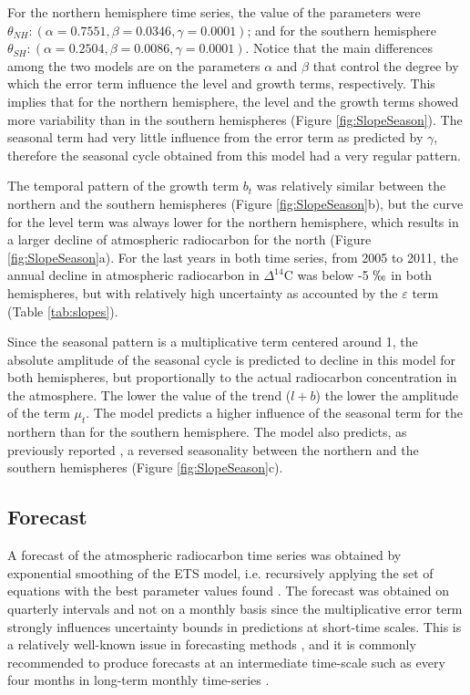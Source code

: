 \documentclass[a4paper, 11pt]{article}
\begin{document}
For the northern hemisphere time series, the value of the parameters were $\theta_{NH}: (\alpha = 0.7551, \beta = 0.0346, \gamma = 0.0001)$; and for the southern hemisphere $\theta_{SH} : (\alpha = 0.2504, \beta = 0.0086, \gamma = 0.0001)$. Notice that the main differences among the two models are on the parameters $\alpha$ and $\beta$ that control the degree by which the error term influence the level and growth terms, respectively. This implies that for the northern hemisphere, the level and the growth terms showed more variability than in the southern hemispheres (Figure \ref{fig:SlopeSeason}). The seasonal term had very little influence from the error term as predicted by  $\gamma$, therefore the seasonal cycle obtained from this model had a very regular pattern. 

The temporal pattern of the growth term $b_t$ was relatively similar between the northern and the southern hemispheres (Figure \ref{fig:SlopeSeason}b), but the curve for the level term was always lower for the northern hemisphere, which results in a larger decline of atmospheric radiocarbon for the north (Figure \ref{fig:SlopeSeason}a). For the last years in both time series, from 2005 to 2011,
the annual decline in atmospheric radiocarbon in $\Delta^{14}$C was below -5 $\permil$ in both hemispheres, but with relatively high uncertainty  as  accounted by the $\varepsilon$ term (Table \ref{tab:slopes}).


Since the seasonal pattern is a multiplicative term centered around 1, the absolute amplitude of the seasonal cycle is predicted to decline in this model for both hemispheres, but proportionally to the actual radiocarbon concentration in the atmosphere. The lower the value of the trend ($l + b$) the lower the amplitude of the term $\mu_t$. The model predicts a higher influence of the seasonal term for the northern than for the southern hemisphere.
The model also predicts, as previously reported \citep{Levin2010Tellus, Currie2011}, a reversed seasonality between the northern and the southern hemispheres (Figure \ref{fig:SlopeSeason}c). 

\subsection{Forecast}
A forecast of the atmospheric radiocarbon time series was obtained by exponential smoothing of the ETS model, i.e. recursively applying the set of equations with the best parameter values found \citep{Hyndman2008}. The forecast was obtained on quarterly intervals and not on a monthly basis since the multiplicative error term strongly influences uncertainty bounds in predictions at short-time scales. This is a relatively well-known issue in forecasting methods \citep{Athanasopoulos}, and it is commonly recommended to produce forecasts at an intermediate time-scale such as every four months in long-term monthly time-series \citep{Nijman1990, Rossana1995, Athanasopoulos}. 
\end{document}
